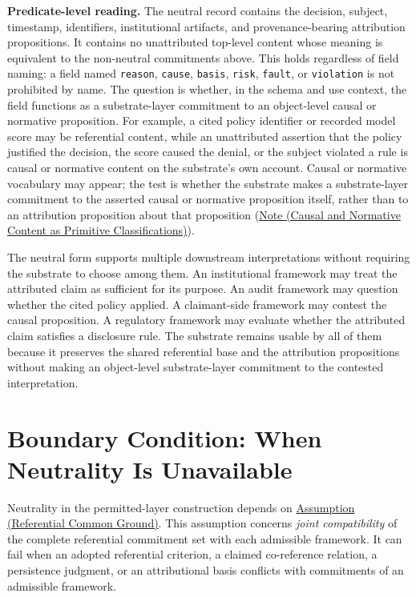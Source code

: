 \documentclass[11pt]{article}
\theoremstyle{plain}
\theoremstyle{definition}
\theoremstyle{remark}
\newcommand{\AssumpRef}[2]{\hyperref[#1]{Assumption (#2)}}
\newcommand{\NoteRef}[2]{\hyperref[#1]{Note (#2)}}
\begin{document}
\textbf{Predicate-level reading.}
The neutral record contains the
decision, subject, timestamp, identifiers, institutional artifacts, and
provenance-bearing attribution propositions.
It contains no unattributed top-level content whose meaning is equivalent to
the non-neutral commitments above.
This holds regardless of field naming:
a field named \texttt{reason}, \texttt{cause},
\texttt{basis}, \texttt{risk}, \texttt{fault}, or \texttt{violation}
is not prohibited by name.
The question is whether, in the schema and use context,
the field functions as a substrate-layer commitment to an object-level causal or normative proposition.
For example, a cited policy identifier or recorded model score may be referential content,
while an unattributed assertion that the policy justified the decision,
the score caused the denial, or the subject violated a rule is
causal or normative content on the substrate's own account.
Causal or normative vocabulary may appear;
the test is whether the substrate makes a substrate-layer commitment
to the asserted causal or normative proposition itself,
rather than to an attribution proposition about that proposition
(\NoteRef{se100.note.CausalNormative}{Causal and Normative Content as Primitive
  Classifications}).

The neutral form supports multiple downstream interpretations without
requiring the substrate to choose among them.
An institutional framework may treat the attributed claim as sufficient
for its purpose.
An audit framework may question whether the cited policy applied.
A claimant-side framework may contest the causal proposition.
A regulatory framework may evaluate whether the attributed claim satisfies
a disclosure rule.
The substrate remains usable by all of them
because it preserves the shared referential base and the attribution
propositions without making an object-level substrate-layer commitment
to the contested interpretation.

\section{Boundary Condition: When Neutrality Is Unavailable}
\label{sec:boundary}

Neutrality in the permitted-layer construction depends on
\AssumpRef{se100.assump.ReferentialCommonGround}{Referential Common Ground}.
This assumption concerns \emph{joint compatibility} of the complete
referential commitment set with each admissible framework.
It can fail when an adopted referential criterion, a claimed co-reference
relation, a persistence judgment, or an attributional basis conflicts
with commitments of an admissible framework.
\end{document}
